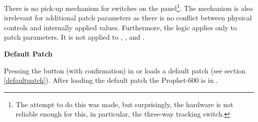 There is no pick-up mechanism for switches on the panel\footnote{The attempt to do this was made, but surprisingly, the hardware is not reliable enough for this, in particular, the three-way tracking switch.}. The mechanism is also irrelevant for additional patch parameters as there is no conflict between physical controls and internally applied values. Furthermore, the logic applies only to patch parameters. It is not applied to \mastertune, \mastervol, \pitchbender and \modwheel.

\textbf{Default Patch}

Pressing the \preset button (with confirmation) in \shiftmode or \shiftlock loads a default patch (see section \ref{defaultpatch}). After loading the default patch the Prophet-600 is in \presetpatch.
